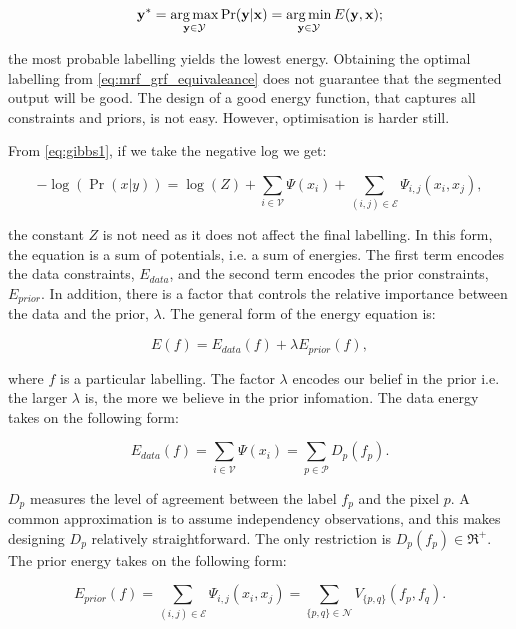 \begin{equation}
\mathbf{y^*} = \operatorname*{arg\,max}_{\mathbf{y} \in \mathcal{Y}}\Pr(\mathbf{y}|\mathbf{x}) = \operatorname*{arg\,min}_{\mathbf{y} \in \mathcal{Y}}E(\mathbf{y},\mathbf{x});
\label{eq:mrf_grf_equivaleance}
\end{equation}

the most probable labelling yields the lowest energy.
Obtaining the optimal labelling from \autoref{eq:mrf_grf_equivaleance} does not guarantee that the segmented output will be good.
The design of a good energy function, that captures all constraints and priors, is not easy.
However, optimisation is harder still.

From \autoref{eq:gibbs1}, if we take the negative log we get:

\begin{equation}
	-\log(\Pr(x|y)) = \log(Z) + \sum_{i \in \mathcal{V}}\Psi(x_i) + \sum_{(i,j) \in \mathcal{E}}\Psi_{i,j}(x_i,x_j),
\end{equation}

the constant $Z$ is not need as it does not affect the final labelling.
In this form, the equation is a sum of potentials, i.e. a sum of energies.
The first term encodes the data constraints, $E_{data}$, and the second term encodes the prior constraints, $E_{prior}$.
In addition, there is a factor that controls the relative importance between the data and the prior, $\lambda$.
The general form of the energy equation is:

\begin{equation}
	E(f) = E_{data}(f) + \lambda E_{prior}(f),
	\label{eq:generalform}
\end{equation}

where $f$ is a particular labelling.
The factor $\lambda$ encodes our belief in the prior i.e. the larger $\lambda$ is, the more we believe in the prior infomation.
The data energy takes on the following form:

\begin{equation}
	E_{data}(f) = \sum_{i \in \mathcal{V}} \Psi(x_i) =  \sum_{p \in \mathcal{P}}D_p(f_p).
	\label{eq:dataenergy}
\end{equation}

$D_p$ measures the level of agreement between the label $f_p$ and the pixel $p$.
A common approximation is to assume independency observations, and this makes designing $D_p$ relatively straightforward.
The only restriction is  $D_p(f_p) \in \Re^{+}$.
The prior energy takes on the following form:

\begin{equation}
	E_{prior}(f) = \sum_{(i,j) \in \mathcal{E}}\Psi_{i,j}(x_i,x_j) = \sum_{\{p,q\} \in \mathcal{N}}V_{\{p,q\}}(f_p,f_q).
	\label{eq:priorenergy}
\end{equation}

